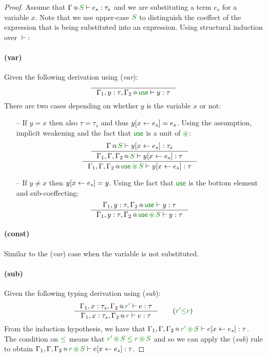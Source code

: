 \begin{proof}
Assume that $\coctx{\Gamma}{\cclrd{S}} \vdash e_s : \tau_s$ and we are substituting a term $e_s$ for 
a variable $x$. Note that we use upper-case $\cclrd{S}$ to distinguish the coeffect of the expression
that is being substituted into an expression. Using structural induction over $\vdash$:

\paragraph{(var)} Given the following derivation using (\emph{var}):
\[
\inference
  { }
  {\coctx{\Gamma_1, y:\tau, \Gamma_2}{\cunit} \vdash y : \tau }
\]
There are two cases depending on whether $y$ is the variable $x$ or not:
\begin{itemize}
\item[--] If $y=x$ then also $\tau = \tau_s$ and thus $y[x \leftarrow e_s] = e_s$. Using the assumption,
implicit weakening and the fact that $\cunit$ is a unit of $\cseq$:
\[
\inference
 {\inference 
  {\coctx{\Gamma}{\cclrd{S}} \vdash \subst{y}{x}{e_s} : \tau_s }
  {\coctx{\Gamma_1, \Gamma, \Gamma_2}{\cclrd{S}} \vdash \subst{y}{x}{e_s} : \tau } }
 {\coctx{\Gamma_1, \Gamma, \Gamma_2}{\cunit\,\cseq\,\cclrd{S}} \vdash \subst{y}{x}{e_s} : \tau } 
\]
\item[--] If $y\neq x$ then $y[x \leftarrow e_s] = y$. Using the fact that $\cunit$ is the bottom element
and sub-coeffecting:
\[
\inference
  {\coctx{\Gamma_1, y:\tau, \Gamma_2}{\cunit} \vdash y : \tau }
  {\coctx{\Gamma_1, y:\tau, \Gamma_2}{\cunit\,\cseq\,\cclrd{S}} \vdash y : \tau }
\]
\end{itemize}

\paragraph{(const)} Similar to the (\emph{var}) case when the variable is not substituted.

\paragraph{(sub)} Given the following typing derivation using (\emph{sub}):
\[
\inference
  {\coctx{\Gamma_1,x:\tau_s,\Gamma_2}{\cclrd{r'}} \vdash e : \tau }
  {\coctx{\Gamma_1,x:\tau_s,\Gamma_2}{\cclrd{r}} \vdash e : \tau }\quad\quad(\cclrd{r'} \cleq \cclrd{r})
\]
From the induction hypothesis, we have that
$\coctx{\Gamma_1,\Gamma,\Gamma_2}{\cclrd{r'}\,\cseq\,\cclrd{S}} \vdash \subst{e}{x}{e_s} : \tau$.
The condition on $\cleq$ means that $\cclrd{r'}\,\cseq\,\cclrd{S}\;\cleq\;\cclrd{r}\,\cseq\,\cclrd{S}$
and so we can apply the (\emph{sub}) rule to obtain
$\coctx{\Gamma_1,\Gamma,\Gamma_2}{\cclrd{r}\,\cseq\,\cclrd{S}} \vdash \subst{e}{x}{e_s} : \tau$.


\end{proof}
